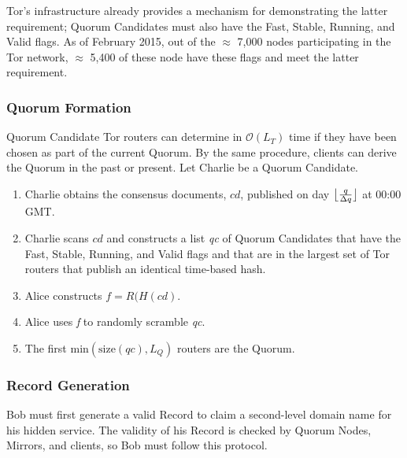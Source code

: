 \documentclass{sig-alternate}
\DeclarePairedDelimiter{\floor}{\lfloor}{\rfloor}
\begin{document}
Tor's infrastructure already provides a mechanism for demonstrating the latter requirement; Quorum Candidates must also have the Fast, Stable, Running, and Valid flags. As of February 2015, out of the $ \approx $ 7,000 nodes participating in the Tor network, $ \approx $ 5,400 of these node have these flags and meet the latter requirement.\cite{TorMetrics}

\subsubsection{Quorum Formation}

Quorum Candidate Tor routers can determine in  $ \mathcal{O}(L_{T}) $ time if they have been chosen as part of the current Quorum. By the same procedure, clients can derive the Quorum in the past or present. Let Charlie be a Quorum Candidate.

\begin{enumerate}
	\item Charlie obtains the consensus documents, $ cd $, published on day $ \floor[\big]{\frac{q}{\Delta q}} $ at 00:00 GMT.
	\item Charlie scans $ cd $ and constructs a list \emph{qc} of Quorum Candidates that have the Fast, Stable, Running, and Valid flags and that are in the largest set of Tor routers that publish an identical time-based hash. 
	\item Alice constructs $ f = \mathit{R}(H(\mathit{cd}) $.
	\item Alice uses \emph{f} to randomly scramble \emph{qc}.
	\item The first $ \mathrm{min}(\mathrm{size}(\mathit{qc}), L_{Q}) $ routers are the Quorum.
\end{enumerate}

\subsubsection{Record Generation}

Bob must first generate a valid Record to claim a second-level domain name for his hidden service. The validity of his Record is checked by Quorum Nodes, Mirrors, and clients, so Bob must follow this protocol.
\end{document}
